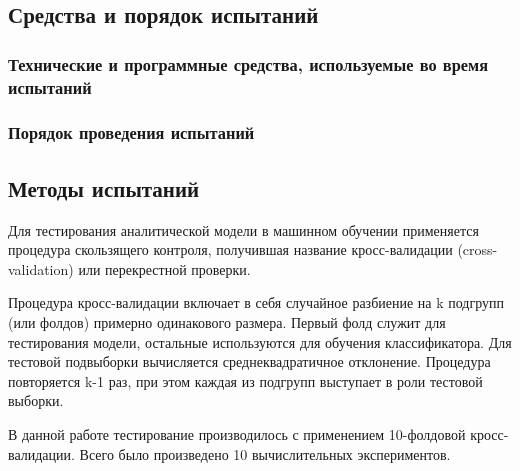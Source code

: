 \subsection{Средства и порядок испытаний}
\subsubsection{Технические и программные средства, используемые во время испытаний}



\subsubsection{Порядок проведения испытаний}


\subsection{Методы испытаний}\label{testing_methods}

Для тестирования аналитической модели в машинном обучении применяется процедура скользящего
контроля, получившая название кросс-валидации (cross-validation) или перекрестной проверки.~\cite{crossval}

Процедура кросс-валидации включает в себя случайное разбиение на k подгрупп (или фолдов) примерно
одинакового размера. Первый фолд служит для тестирования модели, остальные используются для обучения
классификатора. Для тестовой подвыборки вычисляется среднеквадратичное отклонение. Процедура повторяется k-1
раз, при этом каждая из подгрупп выступает в роли тестовой выборки.

В данной работе тестирование производилось с применением 10-фолдовой кросс-валидации. Всего было произведено
10 вычислительных экспериментов.

